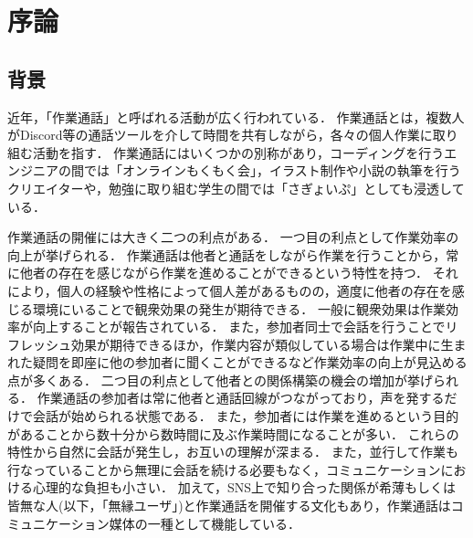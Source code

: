 \chapter{序論\label{sec:introduction}}
\thispagestyle{plain}

\section{背景}

近年，「作業通話」と呼ばれる活動が広く行われている．
作業通話とは，複数人がDiscord\cite{Discord}等の通話ツールを介して時間を共有しながら，各々の個人作業に取り組む活動を指す．
作業通話にはいくつかの別称があり，コーディングを行うエンジニアの間では「オンラインもくもく会」，イラスト制作や小説の執筆を行うクリエイターや，勉強に取り組む学生の間では「さぎょいぷ」としても浸透している．

作業通話の開催には大きく二つの利点がある．
一つ目の利点として作業効率の向上が挙げられる．
作業通話は他者と通話をしながら作業を行うことから，常に他者の存在を感じながら作業を進めることができるという特性を持つ．
それにより，個人の経験や性格によって個人差があるものの，適度に他者の存在を感じる環境にいることで観衆効果の発生が期待できる．
一般に観衆効果は作業効率が向上することが報告されている\cite{Zajonc}\cite{Matsumoto}\cite{Miyamoto}．
また，参加者同士で会話を行うことでリフレッシュ効果が期待できるほか，作業内容が類似している場合は作業中に生まれた疑問を即座に他の参加者に聞くことができるなど作業効率の向上が見込める点が多くある．
二つ目の利点として他者との関係構築の機会の増加が挙げられる．
作業通話の参加者は常に他者と通話回線がつながっており，声を発するだけで会話が始められる状態である．
また，参加者には作業を進めるという目的があることから数十分から数時間に及ぶ作業時間になることが多い．
これらの特性から自然に会話が発生し，お互いの理解が深まる．
また，並行して作業も行なっていることから無理に会話を続ける必要もなく，コミュニケーションにおける心理的な負担も小さい．
加えて，SNS上で知り合った関係が希薄もしくは皆無な人(以下，「無縁ユーザ」)と作業通話を開催する文化もあり，作業通話はコミュニケーション媒体の一種として機能している．


